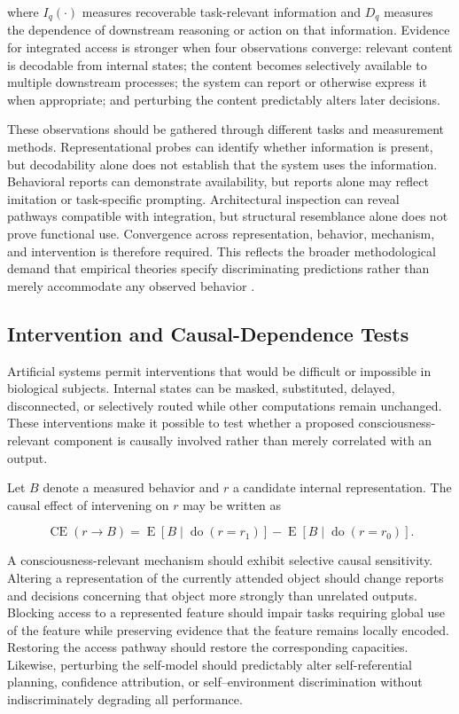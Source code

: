 where $I_q(\cdot)$ measures recoverable task-relevant information and $D_q$ measures the dependence of downstream reasoning or action on that information. Evidence for integrated access is stronger when four observations converge: relevant content is decodable from internal states; the content becomes selectively available to multiple downstream processes; the system can report or otherwise express it when appropriate; and perturbing the content predictably alters later decisions.

These observations should be gathered through different tasks and measurement methods. Representational probes can identify whether information is present, but decodability alone does not establish that the system uses the information. Behavioral reports can demonstrate availability, but reports alone may reflect imitation or task-specific prompting. Architectural inspection can reveal pathways compatible with integration, but structural resemblance alone does not prove functional use. Convergence across representation, behavior, mechanism, and intervention is therefore required. This reflects the broader methodological demand that empirical theories specify discriminating predictions rather than merely accommodate any observed behavior \cite{doerig2021hard}.

\subsection{Intervention and Causal-Dependence Tests}

Artificial systems permit interventions that would be difficult or impossible in biological subjects. Internal states can be masked, substituted, delayed, disconnected, or selectively routed while other computations remain unchanged. These interventions make it possible to test whether a proposed consciousness-relevant component is causally involved rather than merely correlated with an output.

Let $B$ denote a measured behavior and $r$ a candidate internal representation. The causal effect of intervening on $r$ may be written as

\begin{equation}
\operatorname{CE}(r \rightarrow B)
=
\operatorname{E}
\left[
B \mid \operatorname{do}(r=r_1)
\right]
-
\operatorname{E}
\left[
B \mid \operatorname{do}(r=r_0)
\right].
\label{eq:causal-effect-representation}
\end{equation}

A consciousness-relevant mechanism should exhibit selective causal sensitivity. Altering a representation of the currently attended object should change reports and decisions concerning that object more strongly than unrelated outputs. Blocking access to a represented feature should impair tasks requiring global use of the feature while preserving evidence that the feature remains locally encoded. Restoring the access pathway should restore the corresponding capacities. Likewise, perturbing the self-model should predictably alter self-referential planning, confidence attribution, or self--environment discrimination without indiscriminately degrading all performance.

